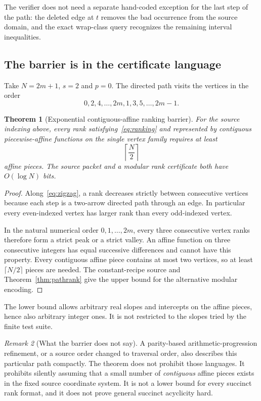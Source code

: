 \documentclass[11pt,letterpaper]{article}
\newtheorem{theorem}{Theorem}[section]
\theoremstyle{definition}
\theoremstyle{remark}\newtheorem{remark}[theorem]{Remark}
\begin{document}
The verifier does not need a separate hand-coded exception for the last step of the path: the deleted edge at $t$ removes the bad occurrence from the source domain, and the exact wrap-class query recognizes the remaining interval inequalities.

\subsection{The barrier is in the certificate language}
\label{sec:barrier}

Take $N=2m+1$, $s=2$ and $p=0$. The directed path visits the vertices in the order
\begin{equation}
       0,2,4,\ldots,2m,1,3,5,\ldots,2m-1.
 \label{eq:zigzag}
\end{equation}

\begin{theorem}[Exponential contiguous-affine ranking barrier]
\label{thm:barrier}
For the source indexing above, every rank satisfying~\eqref{eq:ranking} and represented by contiguous piecewise-affine functions on the single vertex family requires at least
\[
                              \left\lceil\frac{N}{2}\right\rceil
\]
affine pieces. The source packet and a modular rank certificate both have $O(\log N)$ bits.
\end{theorem}
\begin{proof}
Along~\eqref{eq:zigzag}, a rank decreases strictly between consecutive vertices because each step is a two-arrow directed path through an edge. In particular every even-indexed vertex has larger rank than every odd-indexed vertex.

In the natural numerical order $0,1,\ldots,2m$, every three consecutive vertex ranks therefore form a strict peak or a strict valley. An affine function on three consecutive integers has equal successive differences and cannot have this property. Every contiguous affine piece contains at most two vertices, so at least $\lceil N/2\rceil$ pieces are needed. The constant-recipe source and Theorem~\ref{thm:pathrank} give the upper bound for the alternative modular encoding.
\end{proof}

The lower bound allows arbitrary real slopes and intercepts on the affine pieces, hence also arbitrary integer ones. It is not restricted to the slopes tried by the finite test suite.

\begin{remark}[What the barrier does not say]
A parity-based arithmetic-progression refinement, or a source order changed to traversal order, also describes this particular path compactly. The theorem does not prohibit those languages. It prohibits silently assuming that a small number of \emph{contiguous} affine pieces exists in the fixed source coordinate system. It is not a lower bound for every succinct rank format, and it does not prove general succinct acyclicity hard.
\end{remark}
\end{document}
